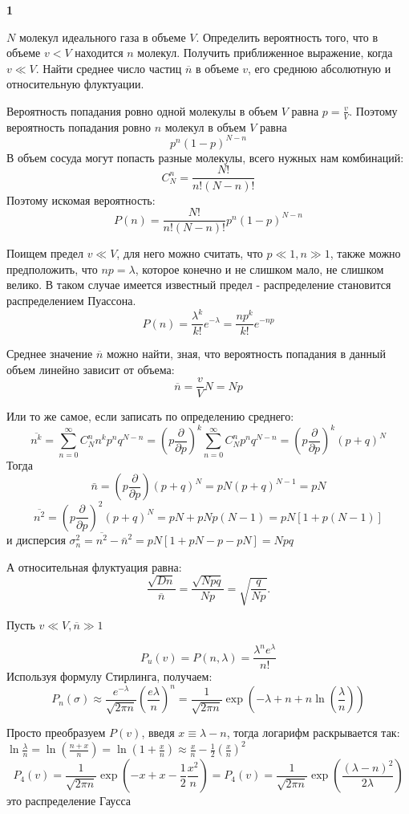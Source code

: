 \documentclass[a4paper,12pt]{article} %
\begin{document}
\begin{task}\textbf{1}

$ N $ молекул идеального газа в объеме $ V $. 
Определить вероятность того, что в объеме $v < V$ находится $ n $ молекул. Получить приближенное выражение, когда  $v \ll V $. 
Найти среднее число частиц $\overline{n}$ в объеме $ v $, его среднюю абсолютную и относительную флуктуации.  


Вероятность попадания ровно одной молекулы в объем $ V$ равна $ p=\frac{v}{V}$. 
Поэтому вероятность попадания ровно $n$ молекул в объем $V$ равна 
\[ p^n (1-p)^{N-n} \]
В объем сосуда могут попасть разные молекулы, всего нужных нам комбинаций:
\[ C_N^n =\frac{N!}{n!(N-n)!}\]
Поэтому искомая вероятность:
\[ P(n)=\frac{N!}{n!(N-n)!}p^n (1-p)^{N-n} \]

Поищем предел $v \ll V$,  для него можно считать, что $ p\ll 1, n\gg 1$, также можно предположить, что $ np=\lambda$, которое конечно и не слишком мало, не слишком велико.
В таком случае имеется известный предел - распределение становится распределением Пуассона.
\[ P(n)=\frac{\lambda^k}{k!}e^{-\lambda}=
\frac{np^k}{k!}e^{-np}\]

Среднее значение $\overline{n}$ можно найти, зная, что вероятность попадания в данный объем линейно зависит от объема:
\[ \overline{n}=\frac{v}{V}N=Np \]

Или то же самое, если записать по определению среднего:
$$
\overline{n^{k}}=\sum_{n=0}^{\infty} C_{N}^{n} n^{k} p^{n} q^{N-n}=\left(p \frac{\partial}{\partial p}\right)^{k} \sum_{n=0}^{\infty} C_{N}^{n} p^{n} q^{N-n}=\left(p \frac{\partial}{\partial p}\right)^{k}(p+q)^{N}
$$
Тогда
$$
\bar{n}=\left(p \frac{\partial}{\partial p}\right)(p+q)^{N}=p N(p+q)^{N-1}=p N
$$
\[
\overline{n^{2}}=\left(p \frac{\partial}{\partial p}\right)^{2}(p+q)^{N}=p N+p N p(N-1)=p N[1+p(N-1)] 
\]
и дисперсия  $\sigma_{n}^{2}=\overline{n^{2}}-\bar{n}^{2}=p N[1+p N-p-p N]=N p q$

А относительная флуктуация равна:
\[ \frac{\sqrt{D n}}{\overline{n}}=\frac{\sqrt{Npq}}{Np}=\sqrt{\frac{q}{Np}}. \]

Пусть $ v\ll V, \overline{n}\gg 1 $

$$
P_{u}(v)=P(n, \lambda)=\frac{\lambda^{n} e^{\lambda}}{n !}
$$
Используя формулу Стирлинга, получаем:
$$
P_{n}(\sigma) \approx \frac{e^{-\lambda}}{\sqrt{2 \pi n}}\left(\frac{e \lambda}{n}\right)^{n}=\frac{1}{\sqrt{2 \pi n}} 
\operatorname{exp}\left(-\lambda+n+n \ln \left(\frac{\lambda}{n}\right)\right)
$$

Просто преобразуем $ P(v)$, введя $ x\equiv \lambda -n$, тогда логарифм раскрывается так: $\ln \frac{\lambda}{n}=\ln \left(\frac{n+x}{n}\right)=\ln \left(1+\frac{x}{n}\right) \approx \frac{x}{n}-\frac{1}{2}\left(\frac{x}{n}\right)^{2}$
%
$$
P_{4}(v)=\frac{1}{\sqrt{2 \pi n}} \operatorname{exp}\left(-x+x-\frac{1}{2} \frac{x^{2}}{n}\right)=
P_{4}(v)=\frac{1}{\sqrt{2 \pi n}} \operatorname{exp}\left(\frac{(\lambda - n)^2}{2\lambda}\right)
$$
это распределение Гаусса



\end{task}
\end{document}
